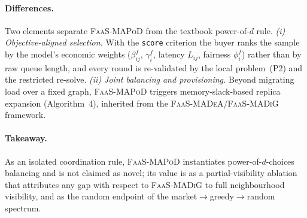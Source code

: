 \paragraph{Differences.} Two elements separate \textsc{FaaS-MAPoD} from the
textbook power-of-$d$ rule. \emph{(i) Objective-aligned selection.} With the
\texttt{score} criterion the buyer ranks the sample by the model's economic
weights ($\beta_{ij}^f$, $\gamma_i^f$, latency $L_{ij}$, fairness $\phi_i^f$)
rather than by raw queue length, and every round is re-validated by the local
problem~(P2) and the restricted re-solve. \emph{(ii) Joint balancing and
provisioning.} Beyond migrating load over a fixed graph, \textsc{FaaS-MAPoD}
triggers memory-slack-based replica expansion (Algorithm~4), inherited from the
\textsc{FaaS-MADeA}/\textsc{FaaS-MADiG} framework.

\paragraph{Takeaway.} As an isolated coordination rule, \textsc{FaaS-MAPoD}
instantiates power-of-$d$-choices balancing and is not claimed as novel; its
value is as a partial-visibility ablation that attributes any gap with respect
to \textsc{FaaS-MADiG} to full neighbourhood visibility, and as the random
endpoint of the market$\to$greedy$\to$random spectrum.
